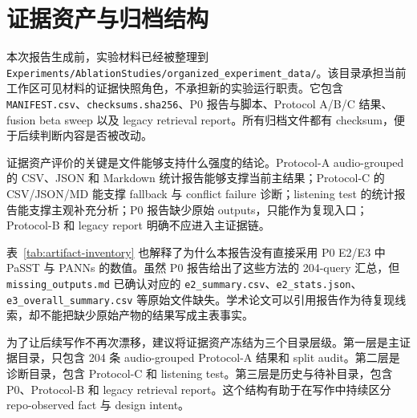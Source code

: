 \chapter{证据资产与归档结构}

本次报告生成前，实验材料已经被整理到 \texttt{Experiments/AblationStudies/organized\_experiment\_data/}。该目录承担当前工作区可见材料的证据快照角色，不承担新的实验运行职责。它包含 \texttt{MANIFEST.csv}、\texttt{checksums.sha256}、P0 报告与脚本、Protocol A/B/C 结果、fusion beta sweep 以及 legacy retrieval report。所有归档文件都有 checksum，便于后续判断内容是否被改动。

证据资产评价的关键是文件能够支持什么强度的结论。Protocol-A audio-grouped 的 CSV、JSON 和 Markdown 统计报告能够支撑当前主结果；Protocol-C 的 CSV/JSON/MD 能支撑 fallback 与 conflict failure 诊断；listening test 的统计报告能支撑主观补充分析；P0 报告缺少原始 outputs，只能作为复现入口；Protocol-B 和 legacy report 明确不应进入主证据链。

\begin{table}[H]
	\centering
	\caption{主要证据资产、来源状态与论文用途。}
	\label{tab:artifact-inventory}
	\small
\end{table}

表~\ref{tab:artifact-inventory} 也解释了为什么本报告没有直接采用 P0 E2/E3 中 PaSST 与 PANNs 的数值。虽然 P0 报告给出了这些方法的 204-query 汇总，但 \texttt{missing\_outputs.md} 已确认对应的 \texttt{e2\_summary.csv}、\texttt{e2\_stats.json}、\texttt{e3\_overall\_summary.csv} 等原始文件缺失。学术论文可以引用报告作为待复现线索，却不能把缺少原始产物的结果写成主表事实。

为了让后续写作不再次漂移，建议将证据资产冻结为三个目录层级。第一层是主证据目录，只包含 204 条 audio-grouped Protocol-A 结果和 split audit。第二层是诊断目录，包含 Protocol-C 和 listening test。第三层是历史与待补目录，包含 P0、Protocol-B 和 legacy retrieval report。这个结构有助于在写作中持续区分 repo-observed fact 与 design intent。
